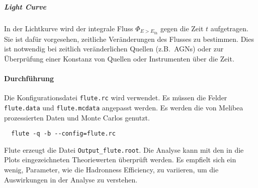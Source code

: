 \subparagraph{Light Curve}
In der Lichtkurve wird
der integrale Fluss $\Phi_{E > E_\text{th}}$ gegen die Zeit $t$
aufgetragen.
Sie ist dafür vorgesehen,
zeitliche Veränderungen des Flusses zu bestimmen.
Dies ist notwendig bei zeitlich veränderlichen Quellen
(z.B.\ AGNs)
oder zur Überprüfung einer Konstanz von Quellen oder Instrumenten
über die Zeit.



\paragraph{Durchführung}%

Die Konfigurationsdatei \texttt{flute.rc} wird verwendet.
Es müssen die Felder \texttt{flute.data} und \texttt{flute.mcdata} angepasst werden.
Es werden die von Melibea prozessierten Daten und Monte Carlos genutzt.


\begin{lstlisting}
  flute -q -b --config=flute.rc
\end{lstlisting}

Flute erzeugt die Datei \texttt{Output\_flute.root}.
Die Analyse kann mit den in die Plots eingezeichneten Theoriewerten überprüft werden.
Es empfielt sich ein wenig, Parameter, wie die Hadronness Efficiency, zu variieren,
um die Auswirkungen in der Analyse zu verstehen.
